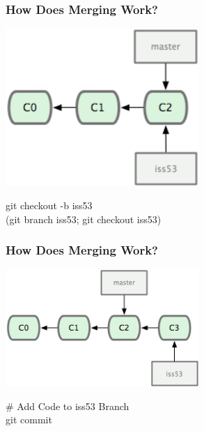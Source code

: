 \begin{frame}
\frametitle{\large How Does Merging Work?}
\begin{center}
\includegraphics[width=0.55\textwidth]{img/branching_images/f2.png}
\end{center}
\vspace{1mm}
\begin{center}
\small git checkout -b iss53 \\
\small (git branch iss53; git checkout iss53)
\end{center}
\end{frame}

\begin{frame}
\frametitle{\large How Does Merging Work?}
\begin{center}
\includegraphics[width=0.55\textwidth]{img/branching_images/f3.png}
\end{center}
\vspace{2mm}
\begin{center}
\# Add Code to iss53 Branch \\
git commit
\end{center}
\end{frame}


